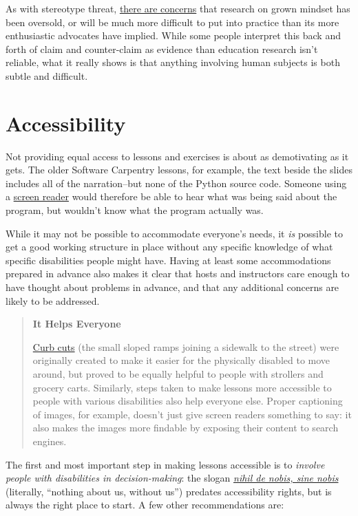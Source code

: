 \documentclass[10pt,statementpaper]{memoir}
\begin{document}
As with stereotype threat,
\href{http://www.learningspy.co.uk/psychology/growth-mindset-bollocks/}{there
are concerns} that research on grown mindset has been oversold, or will
be much more difficult to put into practice than its more enthusiastic
advocates have implied. While some people interpret this back and forth
of claim and counter-claim as evidence than education research isn't
reliable, what it really shows is that anything involving human subjects
is both subtle and difficult.

\section{Accessibility}\label{accessibility}

Not providing equal access to lessons and exercises is about as
demotivating as it gets. The older Software Carpentry lessons, for
example, the text beside the slides includes all of the narration--but
none of the Python source code. Someone using a
\href{https://en.wikipedia.org/wiki/Screen_reader}{screen reader} would
therefore be able to hear what was being said about the program, but
wouldn't know what the program actually was.

While it may not be possible to accommodate everyone's needs, it
\emph{is} possible to get a good working structure in place without any
specific knowledge of what specific disabilities people might have.
Having at least some accommodations prepared in advance also makes it
clear that hosts and instructors care enough to have thought about
problems in advance, and that any additional concerns are likely to be
addressed.

\begin{quote}
\textbf{It Helps Everyone}

\href{https://en.wikipedia.org/wiki/Curb_cut}{Curb cuts} (the small
sloped ramps joining a sidewalk to the street) were originally created
to make it easier for the physically disabled to move around, but proved
to be equally helpful to people with strollers and grocery carts.
Similarly, steps taken to make lessons more accessible to people with
various disabilities also help everyone else. Proper captioning of
images, for example, doesn't just give screen readers something to say:
it also makes the images more findable by exposing their content to
search engines.
\end{quote}

The first and most important step in making lessons accessible is to
\emph{involve people with disabilities in decision-making}: the slogan
\emph{\href{https://en.wikipedia.org/wiki/Nothing_About_Us_Without_Us}{nihil
de nobis, sine nobis}} (literally, ``nothing about us, without us'')
predates accessibility rights, but is always the right place to start. A
few other recommendations are:
\end{document}
